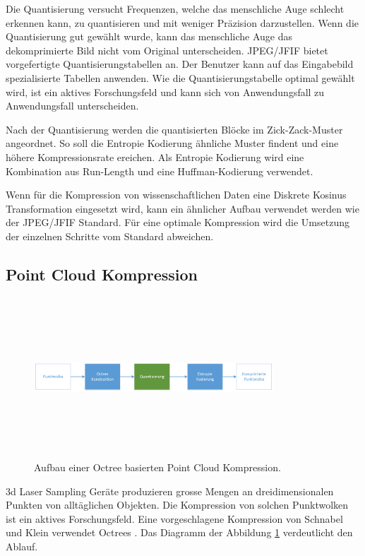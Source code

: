 Die Quantisierung versucht Frequenzen, welche das menschliche Auge schlecht erkennen kann, zu quantisieren und mit weniger Präzision darzustellen. Wenn die Quantisierung gut gewählt wurde, kann das menschliche Auge das dekomprimierte Bild nicht vom Original unterscheiden. JPEG/JFIF bietet vorgefertigte Quantisierungstabellen an. Der Benutzer kann auf das Eingabebild spezialisierte Tabellen anwenden. Wie die Quantisierungstabelle optimal gewählt wird, ist ein aktives Forschungsfeld \cite{wu1993rate:jpeg} \cite{wang2001designing:jpeg} und kann sich von Anwendungsfall zu Anwendungsfall unterscheiden.

Nach der Quantisierung werden die quantisierten Blöcke im Zick-Zack-Muster \cite{wallace1992jpeg} angeordnet. So soll die Entropie Kodierung ähnliche Muster findent und eine höhere Kompressionsrate ereichen. Als Entropie Kodierung wird eine Kombination aus Run-Length \cite{wiki:rle} und eine Huffman-Kodierung \cite{huffman1952method} verwendet.

Wenn für die Kompression von wissenschaftlichen Daten eine Diskrete Kosinus Transformation eingesetzt wird, kann ein ähnlicher Aufbau verwendet werden wie der JPEG/JFIF Standard. Für eine optimale Kompression wird die Umsetzung der einzelnen Schritte vom Standard abweichen.

\subsection{Point Cloud Kompression} \label{state:pointcloud}
\begin{figure}[!htbp]
	\center
	\includegraphics[width=0.8\textwidth,height=6cm,keepaspectratio]{./pictures/state/pointcloud.png}
	\caption{Aufbau einer Octree basierten Point Cloud Kompression.}
	\label{state:pointcloud:abb}
\end{figure}
3d Laser Sampling Geräte produzieren grosse Mengen an dreidimensionalen Punkten von alltäglichen Objekten. Die Kompression von solchen Punktwolken ist ein aktives Forschungsfeld. Eine vorgeschlagene Kompression  von Schnabel und Klein \cite{schnabel2006octree} verwendet Octrees \cite{wiki:octree}. Das Diagramm der Abbildung \ref{state:pointcloud:abb} verdeutlicht den Ablauf.

